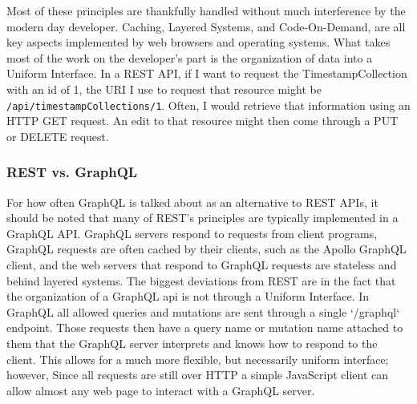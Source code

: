 Most of these principles are thankfully handled without much interference by the modern day developer. Caching, Layered Systems, and Code-On-Demand, are all key aspects implemented by web browsers and operating systems.  What takes most of the work on the developer's part is the organization of data into a Uniform Interface. In a REST API, if I want to request the TimestampCollection with an id of 1, the URI I use to request that resource might be \Verb"/api/timestampCollections/1".  Often, I would retrieve that information using an HTTP GET request.  An edit to that resource might then come through a PUT or DELETE request.

\subsubsection{REST vs. GraphQL}
For how often GraphQL is talked about as an alternative to REST APIs, it should be noted that many of REST's principles are typically implemented in a GraphQL API.  GraphQL servers respond to requests from client programs, GraphQL requests are often cached by their clients, such as the Apollo GraphQL client, and the web servers that respond to GraphQL requests are stateless and behind layered systems.  The biggest deviations from REST are in the fact that the organization of a GraphQL api is not through a Uniform Interface. In GraphQL all allowed queries and mutations are sent through a single `/graphql` endpoint.  Those requests then have a query name or mutation name attached to them that the GraphQL server interprets and knows how to respond to the client.  This allows for a much more flexible, but necessarily uniform interface; however,  Since all requests are still over HTTP a simple JavaScript client can allow almost any web page to interact with a GraphQL server.
